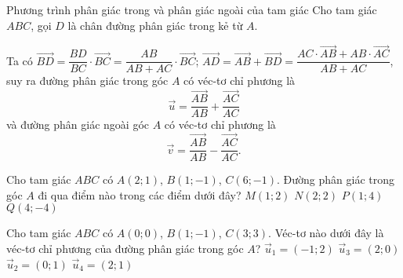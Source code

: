 \begin{dang}{Phương trình phân giác trong và phân giác ngoài của tam giác}
Cho tam giác $ABC$, gọi $D$  là chân đường phân giác trong kẻ từ $A$. 
\begin{center}
\end{center}
Ta có $\overrightarrow{BD} = \dfrac{BD}{BC} \cdot \overrightarrow{BC} = \dfrac{AB}{AB+AC} \cdot \overrightarrow{BC}$; $\overrightarrow{AD} = \overrightarrow{AB} +\overrightarrow{BD} = \dfrac{AC \cdot \overrightarrow{AB} + AB \cdot \overrightarrow{AC}}{AB+AC}$, 
suy ra đường phân giác trong góc $A$ có véc-tơ chỉ phương là 
$$\overrightarrow{u} = \dfrac{\overrightarrow{AB}}{AB} + \dfrac{\overrightarrow{AC}}{AC}$$
và đường phân giác ngoài góc $A$ có véc-tơ chỉ phương là 
$$\overrightarrow{v} = \dfrac{\overrightarrow{AB}}{AB} - \dfrac{\overrightarrow{AC}}{AC}.$$
\end{dang}

\begin{vd}%
Cho tam giác $ABC$ có $A(2;1)$, $B(1;-1)$, $C(6;-1)$. Đường phân giác trong góc $A$ đi qua điểm nào trong các điểm dưới đây?
\choice
{$M(1;2)$}
{$N(2;2)$}
{\True $P(1;4)$}
{$Q(4;-4)$}
\end{vd}


\begin{vd}%
Cho tam giác $ABC$ có $A(0;0)$, $B(1;-1)$, $C(3;3)$. Véc-tơ nào dưới đây là véc-tơ chỉ phương của đường phân giác trong góc $A$?
\choice
{$\overrightarrow{u}_1=(-1;2)$}
{$\overrightarrow{u}_3=(2;0)$}
{\True  $\overrightarrow{u}_2=(0;1)$}
{$\overrightarrow{u}_4=(2;1)$}

\end{vd}


